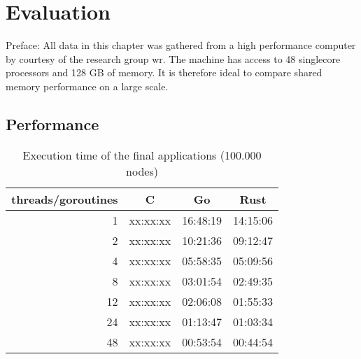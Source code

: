\chapter{Evaluation}
\label{ch:Evaluation}


Preface: All data in this chapter was gathered from a high performance computer by courtesy of the research group \gls{wr}. The machine has access to 48 singlecore processors and 128 GB of memory. It is therefore ideal to compare shared memory performance on a large scale.

\section{Performance}
\label{sec:Evaluaton::Performance}

\begin{table}[htb]
    \centering
    \begin{tabular}{rccc}
        \toprule
            threads/goroutines
            & C
            & Go
            & Rust \\
        \midrule

            1
            & xx:xx:xx
            & 16:48:19
            & 14:15:06 \\

            2
            & xx:xx:xx
            & 10:21:36
            & 09:12:47 \\

            4
            & xx:xx:xx
            & 05:58:35
            & 05:09:56 \\

            8
            & xx:xx:xx
            & 03:01:54
            & 02:49:35 \\

            12
            & xx:xx:xx
            & 02:06:08
            & 01:55:33 \\

            24
            & xx:xx:xx
            & 01:13:47
            & 01:03:34 \\

            48
            & xx:xx:xx
            & 00:53:54
            & 00:44:54 \\

        \bottomrule
    \end{tabular}
    \caption{Execution time of the final applications (100.000 nodes)}
    \label{tb:final_execution_time}
\end{table}

